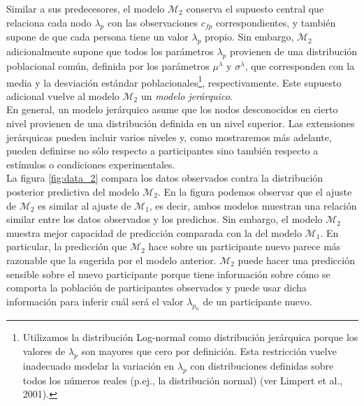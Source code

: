 \documentclass{article}
\begin{document}
\indent Similar a sus predecesores, el modelo $\mathcal M_2$ conserva el supuesto central que relaciona cada nodo $\lambda_p$ con las observaciones $c_{fp}$ correspondientes, y también supone de que cada persona tiene un valor $\lambda_p$ propio. Sin embargo, $\mathcal M_2$ adicionalmente supone que todos los parámetros $\lambda_p$ provienen de una distribución poblacional común, definida por los parámetros $\mu^\lambda$ y $\sigma^\lambda$, que corresponden con la media y la desviación estándar poblacionales\footnote{Utilizamos la distribución Log-normal como distribución jerárquica porque los valores de $\lambda_p$ son mayores que cero por definición. Esta restricción vuelve inadecuado modelar la variación en $\lambda_p$ con distribuciones definidas sobre todos los números reales (p.ej., la distribución normal) (ver Limpert et al., 2001).}, respectivamente. Este supuesto adicional vuelve al modelo $\mathcal M_2$ un \emph{modelo jerárquico}.\\
\indent En general, un modelo jerárquico asume que los nodos desconocidos en cierto nivel provienen de una distribución definida en un nivel superior. Las extensiones jerárquicas pueden incluir varios niveles y, como mostraremos más adelante, pueden definirse no sólo respecto a participantes sino también respecto a estímulos o condiciones experimentales.\\
\indent La figura \ref{fig:data_2} compara los datos observados contra la distribución posterior predictiva del modelo $\mathcal M_2$. En la figura podemos observar que el ajuste de $\mathcal M_2$ es similar al ajuste de $\mathcal M_1$, es decir, ambos modelos muestran una relación similar entre los datos observados y los predichos. Sin embargo, el modelo $\mathcal M_2$ muestra mejor capacidad de predicción comparada con la del modelo $\mathcal M_1$. En particular, la predicción que $\mathcal M_2$ hace sobre un participante nuevo parece más razonable que la sugerida por el modelo anterior. $\mathcal M_2$ puede hacer una predicción sensible sobre el nuevo participante porque tiene información sobre cómo se comporta la población de participantes observados y puede usar dicha información para inferir cuál será el valor $\lambda_{p_{n}}$ de un participante nuevo.
\end{document}
